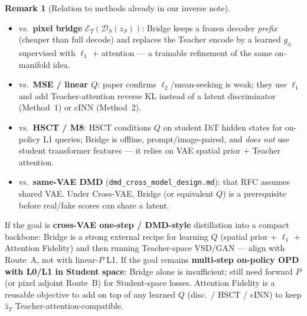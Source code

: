 \documentclass[11pt,a4paper]{article}
\newcommand{\Enc}{\mathcal{E}}
\newcommand{\Dec}{\mathcal{D}}
\theoremstyle{definition}
\newtheorem{remark}{Remark}
\begin{document}
\begin{remark}[Relation to methods already in our inverse note]
\label{rem:vs-methods}
\begin{itemize}[leftmargin=1.4em,itemsep=2pt]
  \item vs.\ \textbf{pixel bridge} $\Enc_T(\Dec_S(z_S))$: Bridge keeps a frozen decoder
        \emph{prefix} (cheaper than full decode) and replaces the Teacher encode by a
        learned $g_\phi$ supervised with $\ell_1$ $+$ attention --- a trainable
        refinement of the same on-manifold idea.
  \item vs.\ \textbf{MSE / linear $Q$}: paper confirms $\ell_2$/mean-seeking is weak;
        they use $\ell_1$ and add Teacher-attention reverse KL instead of a latent
        discriminator (Method~1) or cINN (Method~2).
  \item vs.\ \textbf{HSCT / M8}: HSCT conditions $Q$ on student DiT hidden states for
        on-policy L1 queries; Bridge is offline, prompt/image-paired, and
        \emph{does not} use student transformer features --- it relies on VAE spatial
        prior $+$ Teacher attention.
  \item vs.\ \textbf{same-VAE DMD} (\texttt{dmd\_cross\_model\_design.md}): that RFC
        assumes shared VAE. Under Cross-VAE, Bridge (or equivalent $Q$) is a
        prerequisite before real/fake scores can share a latent.
\end{itemize}
\end{remark}

\begin{tcolorbox}[colback=blue!4,colframe=blue!50!black,title=Takeaway for Flow-Factory XOPD]
If the goal is \textbf{cross-VAE one-step / DMD-style} distillation into a compact
backbone: Bridge is a strong external recipe for learning $Q$ (spatial prior $+$
$\ell_1$ $+$ Attention Fidelity) and then running Teacher-space VSD/GAN --- align with
Route~A, not with linear-$P$ L1.
If the goal remains \textbf{multi-step on-policy OPD with L0/L1 in Student space}:
Bridge alone is insufficient; still need forward $P$ (or pixel adjoint Route~B) for
Student-space losses. Attention Fidelity is a reusable objective to add on top of any
learned $Q$ (disc.\ / HSCT / cINN) to keep $\hat z_T$ Teacher-attention-compatible.
\end{tcolorbox}
\end{document}
